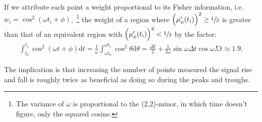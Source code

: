 \documentclass{article}
\newcommand{\td}{\mathrm{d}}
\begin{document}
If we attribute each point a weight proportional to its Fisher information, i.e. $w_i = \cos^2(\omega t_i + \phi)$,~\footnote{The variance of $\omega$ is proportional to the (2,2)-minor, in which time doesn't figure, only the squared cosine.} the weight of a region where $\bkt{\mupp}^2 \geq\sfrac12$ is greater than that of an equivalent region with $\bkt{\mupp}^2 < \sfrac12$  by the factor:
\begin{align*}
	\int_{t_0}^{t_1}\cos^2(\omega t + \phi)\td t = \frac1\omega\int_{\omega t_0}^{\omega t_1} \cos^2\theta\td\theta = \frac{\Delta t}{2} + \frac{1}{2\omega}\sin\omega\Delta t\cos\omega\Sigma t \approx 1.9.
\end{align*}

The implication is that increasing the number of points measured the signal rise and fall is roughly twice as beneficial as doing so during the peaks and troughs.
\end{document}
